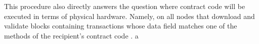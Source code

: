 This procedure also directly answers the question where contract code will be executed in terms of physical hardware. Namely, on all nodes that download and validate blocks containing transactions whose data field matches one of the methods of the recipient's contract code \cite[p.~24]{ethereumWhitepaperGitHub}.
a
